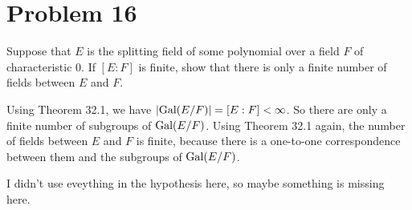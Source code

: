 \documentclass{article}
\begin{document}
\section*{Problem 16}

Suppose that $E$ is the splitting field of some polynomial over a field
$F$ of characteristic 0.  If $[E:F]$ is finite, show that there is only
a finite number of fields between $E$ and $F$.

Using Theorem 32.1, we have $|\mbox{Gal}(E/F)|=[E:F]<\infty$.  So there are
only a finite number of subgroups of $\mbox{Gal}(E/F)$.  Using Theorem 32.1 again,
the number of fields between $E$ and $F$ is finite, because there is a one-to-one
correspondence between them and the subgroups of $\mbox{Gal}(E/F)$.

I didn't use eveything in the hypothesis here, so maybe something is missing here.
\end{document}
